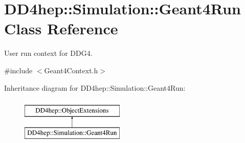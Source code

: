 \hypertarget{class_d_d4hep_1_1_simulation_1_1_geant4_run}{}\section{D\+D4hep\+:\+:Simulation\+:\+:Geant4\+Run Class Reference}
\label{class_d_d4hep_1_1_simulation_1_1_geant4_run}


User run context for D\+D\+G4.  




{\ttfamily \#include $<$Geant4\+Context.\+h$>$}

Inheritance diagram for D\+D4hep\+:\+:Simulation\+:\+:Geant4\+Run\+:\begin{figure}[H]
\begin{center}
\leavevmode
\includegraphics[height=2.000000cm]{class_d_d4hep_1_1_simulation_1_1_geant4_run}
\end{center}
\end{figure}
